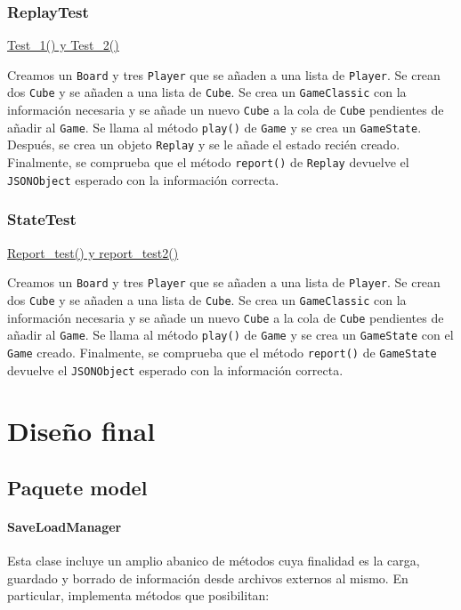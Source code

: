 \documentclass[../DocumentoOficial.tex]{subfiles}
\begin{document}
\subsection{ReplayTest}
\underline{Test\_1() y Test\_2()}

Creamos un \texttt{Board} y tres \texttt{Player} que se añaden a una lista de \texttt{Player}. Se crean dos \texttt{Cube} y se añaden a una lista de \texttt{Cube}. Se crea un \texttt{GameClassic} con la información necesaria y se añade un nuevo \texttt{Cube} a la cola de \texttt{Cube} pendientes de añadir al \texttt{Game}. Se llama al método \texttt{play()} de \texttt{Game} y se crea un \texttt{GameState}. Después, se crea un objeto \texttt{Replay} y se le añade el estado recién creado. Finalmente, se comprueba que el método \texttt{report()} de \texttt{Replay} devuelve el \texttt{JSONObject} esperado con la información correcta.

\subsection{StateTest}
\underline{Report\_test() y report\_test2()}

Creamos un \texttt{Board} y tres \texttt{Player} que se añaden a una lista de \texttt{Player}. Se crean dos \texttt{Cube} y se añaden a una lista de \texttt{Cube}. Se crea un \texttt{GameClassic} con la información necesaria y se añade un nuevo \texttt{Cube} a la cola de \texttt{Cube} pendientes de añadir al \texttt{Game}. Se llama al método \texttt{play()} de \texttt{Game} y se crea un \texttt{GameState} con el \texttt{Game} creado. Finalmente, se comprueba que el método \texttt{report()} de \texttt{GameState} devuelve el \texttt{JSONObject} esperado con la información correcta.


\chapter{Diseño final}

\section{Paquete model}

\subsubsection{SaveLoadManager}

Esta clase incluye un amplio abanico de métodos cuya finalidad es la carga, guardado y borrado de información desde archivos externos al mismo. En particular, implementa métodos que posibilitan:
\end{document}
